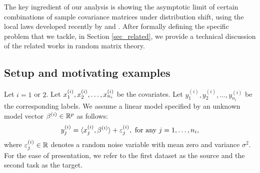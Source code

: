 The key ingredient of our analysis is showing the asymptotic limit of certain combinations of sample covariance matrices under distribution shift, using the local laws developed recently by \citet{isotropic} and \citet{BES_free1}.
After formally defining the specific problem that we tackle, in Section \ref{sec_related}, we provide a technical discussion of the related works in random matrix theory.


\subsection{Setup and motivating examples}\label{sec_mot}

Let $i = 1$ or $2$.
Let $x_1^{(i)}, x_2^{\ss (i)}, \dots, x_{n_i}^{(i)}$ be the covariates.
Let $y_1^{(i)}, y_2^{(i)}, \dots, y_{n_i}^{(i)}$ be the corresponding labels.
We assume a linear model specified by an unknown model vector $\beta^{(i)} \in \real^p$ as follows:
\begin{align}
    y_j^{(i)} = \inner{x_j^{(i)}}{\beta^{(i)}} + \varepsilon_j^{(i)}, \text{ for any } j = 1,\dots,n_i, \label{eq_linear}
\end{align}
where $\varepsilon^{(i)}_j\in\real$ denotes a random noise variable with mean zero and variance $\sigma^2$.
For the ease of presentation, we refer to the first dataset as the source and the second task as the target.

